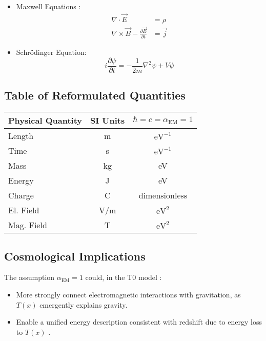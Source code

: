 \documentclass[12pt,a4paper]{article}
\newcommand{\Tfield}{T(x)}
\newcommand{\alphaEM}{\alpha_{\text{EM}}}
\begin{document}
	\begin{itemize}
		\item Maxwell Equations \cite{Feynman1985}:
		\begin{align}
			\nabla \cdot \vec{E} &= \rho \\
			\nabla \times \vec{B} - \frac{\partial \vec{E}}{\partial t} &= \vec{j}
		\end{align}
		\item Schrödinger Equation:
		\begin{equation}
			i \frac{\partial \psi}{\partial t} = -\frac{1}{2m} \nabla^2 \psi + V \psi
		\end{equation}
	\end{itemize}
	
	\subsection{Table of Reformulated Quantities}
	
	\begin{center}
		\begin{tabular}{|l|c|c|}
			\hline
			\textbf{Physical Quantity} & \textbf{SI Units} & \textbf{\(\hbar = c = \alphaEM = 1\)} \\
			\hline
			Length & m & \(\text{eV}^{-1}\) \\
			Time & s & \(\text{eV}^{-1}\) \\
			Mass & kg & eV \\
			Energy & J & eV \\
			Charge & C & dimensionless \\
			El. Field & V/m & \(\text{eV}^2\) \\
			Mag. Field & T & \(\text{eV}^2\) \\
			\hline
		\end{tabular}
	\end{center}
	
	\subsection{Cosmological Implications}
	
	The assumption \(\alphaEM = 1\) could, in the T0 model \cite{pascher_galaxies_2025}:
	\begin{itemize}
		\item More strongly connect electromagnetic interactions with gravitation, as \(\Tfield\) emergently explains gravity.
		\item Enable a unified energy description consistent with redshift due to energy loss to \(\Tfield\) \cite{pascher_messdifferenzen_2025}.
	\end{itemize}
	
\end{document}
